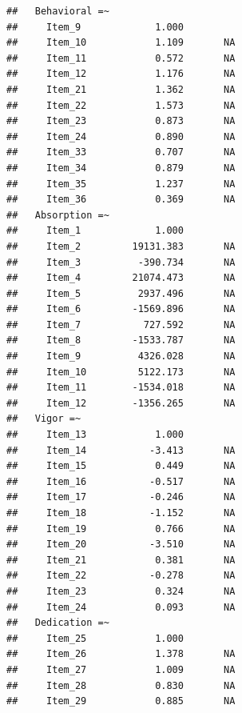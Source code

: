 \documentclass[
]{book}
\begin{document}
\begin{verbatim}
##   Behavioral =~                                        
##     Item_9             1.000                           
##     Item_10            1.109       NA                  
##     Item_11            0.572       NA                  
##     Item_12            1.176       NA                  
##     Item_21            1.362       NA                  
##     Item_22            1.573       NA                  
##     Item_23            0.873       NA                  
##     Item_24            0.890       NA                  
##     Item_33            0.707       NA                  
##     Item_34            0.879       NA                  
##     Item_35            1.237       NA                  
##     Item_36            0.369       NA                  
##   Absorption =~                                        
##     Item_1             1.000                           
##     Item_2         19131.383       NA                  
##     Item_3          -390.734       NA                  
##     Item_4         21074.473       NA                  
##     Item_5          2937.496       NA                  
##     Item_6         -1569.896       NA                  
##     Item_7           727.592       NA                  
##     Item_8         -1533.787       NA                  
##     Item_9          4326.028       NA                  
##     Item_10         5122.173       NA                  
##     Item_11        -1534.018       NA                  
##     Item_12        -1356.265       NA                  
##   Vigor =~                                             
##     Item_13            1.000                           
##     Item_14           -3.413       NA                  
##     Item_15            0.449       NA                  
##     Item_16           -0.517       NA                  
##     Item_17           -0.246       NA                  
##     Item_18           -1.152       NA                  
##     Item_19            0.766       NA                  
##     Item_20           -3.510       NA                  
##     Item_21            0.381       NA                  
##     Item_22           -0.278       NA                  
##     Item_23            0.324       NA                  
##     Item_24            0.093       NA                  
##   Dedication =~                                        
##     Item_25            1.000                           
##     Item_26            1.378       NA                  
##     Item_27            1.009       NA                  
##     Item_28            0.830       NA                  
##     Item_29            0.885       NA                  

\end{verbatim}
\end{document}

